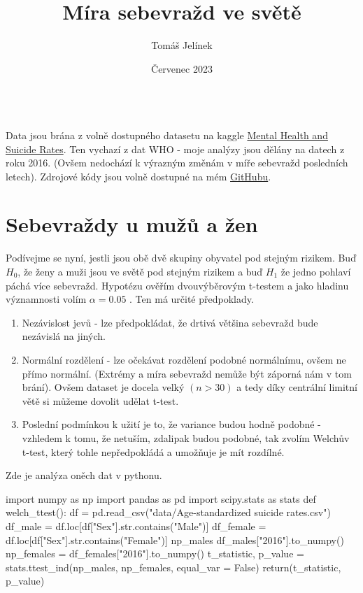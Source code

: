 \documentclass[12pt]{article}
\title{Míra sebevražd ve světě}
\author{Tomáš Jelínek}
\date{Červenec 2023}
\begin{document}
\maketitle
{}\\

Data jsou brána z volně dostupného datasetu na kaggle \href{https://www.kaggle.com/datasets/twinkle0705/mental-health-and-suicide-rates?select=Facilities.csv}{Mental Health and Suicide Rates}. Ten vychazí z dat WHO - moje analýzy jsou dělány na datech z roku 2016. (Ovšem nedochází k výrazným změnám v míře sebevražd posledních letech). Zdrojové kódy jsou volně dostupné na mém \href{https://github.com/Desperadus/PaST-Zapoctak}{GitHubu}.

\section{Sebevraždy u mužů a žen}
Podívejme se nyní, jestli jsou obě dvě skupiny obyvatel pod stejným rizikem. Buď $H_0$, že ženy a muži jsou ve světě pod stejným rizikem a buď $H_1$ že jedno pohlaví páchá více sebevražd. Hypotézu ověřím dvouvýběrovým t-testem a jako hladinu významnosti volím $\alpha = 0.05$ . Ten má určité předpoklady.
\begin{enumerate}
\item Nezávislost jevů - lze předpokládat, že drtivá většina sebevražd bude nezávislá na jiných.
\item Normální rozdělení - lze očekávat rozdělení podobné normálnímu, ovšem ne přímo normální. (Extrémy a míra sebevražd nemůže být záporná nám v tom brání). Ovšem dataset je docela velký $(n > 30)$ a tedy díky centrální limitní větě si můžeme dovolit udělat t-test.
\item Poslední podmínkou k užití je to, že variance budou hodně podobné - vzhledem k tomu, že netuším, zdalipak budou podobné, tak zvolím Welchův t-test, který tohle nepředpokládá a umožňuje je mít rozdílné.
\end{enumerate}

\newpage
Zde je analýza oněch dat v pythonu.
\begin{python}
import numpy as np
import pandas as pd
import scipy.stats as stats
def welch_ttest():
		df = pd.read_csv("data/Age-standardized suicide rates.csv")
    df_male = df.loc[df["Sex"].str.contains("Male")]
    df_female = df.loc[df["Sex"].str.contains("Female")]
    np_males df_males["2016"].to_numpy()
    np_females = df_females["2016"].to_numpy()
    t_statistic, p_value = stats.ttest_ind(np_males, np_females, equal_var = False)
    return(t_statistic, p_value)
\end{python}
\end{document}
